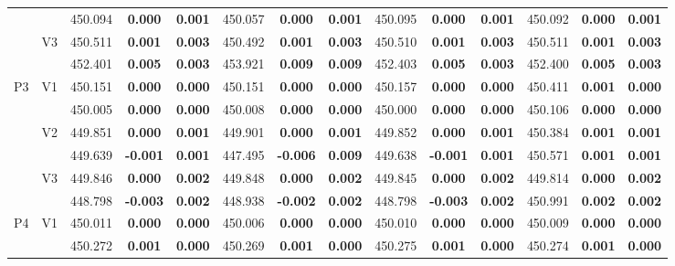 \documentclass[12pt,a4paper]{article}
\begin{document}
\begin{sidewaystable}[H]
{\begin{tabular}{cc|ccc|ccc|ccc|ccc|}
   &  & 450.094 & \textbf{0.000} & \textbf{0.001} & 450.057 & \textbf{0.000} & \textbf{0.001} & 450.095 & \textbf{0.000} & \textbf{0.001} & 450.092 & \textbf{0.000} & \textbf{0.001} \\ 
   & \multirow{2}{*}{V3} & 450.511 & \textbf{0.001} & \textbf{0.003} & 450.492 & \textbf{0.001} & \textbf{0.003} & 450.510 & \textbf{0.001} & \textbf{0.003} & 450.511 & \textbf{0.001} & \textbf{0.003} \\ 
   &  & 452.401 & \textbf{0.005} & \textbf{0.003} & 453.921 & \textbf{0.009} & \textbf{0.009} & 452.403 & \textbf{0.005} & \textbf{0.003} & 452.400 & \textbf{0.005} & \textbf{0.003} \\ 
   \hline \hline\multirow{6}{*}{P3} & \multirow{2}{*}{V1} & 450.151 & \textbf{0.000} & \textbf{0.000} & 450.151 & \textbf{0.000} & \textbf{0.000} & 450.157 & \textbf{0.000} & \textbf{0.000} & 450.411 & \textbf{0.001} & \textbf{0.000} \\ 
   &  & 450.005 & \textbf{0.000} & \textbf{0.000} & 450.008 & \textbf{0.000} & \textbf{0.000} & 450.000 & \textbf{0.000} & \textbf{0.000} & 450.106 & \textbf{0.000} & \textbf{0.000} \\ 
   & \multirow{2}{*}{V2} & 449.851 & \textbf{0.000} & \textbf{0.001} & 449.901 & \textbf{0.000} & \textbf{0.001} & 449.852 & \textbf{0.000} & \textbf{0.001} & 450.384 & \textbf{0.001} & \textbf{0.001} \\ 
   &  & 449.639 & \textbf{-0.001} & \textbf{0.001} & 447.495 & \textbf{-0.006} & \textbf{0.009} & 449.638 & \textbf{-0.001} & \textbf{0.001} & 450.571 & \textbf{0.001} & \textbf{0.001} \\ 
   & \multirow{2}{*}{V3} & 449.846 & \textbf{0.000} & \textbf{0.002} & 449.848 & \textbf{0.000} & \textbf{0.002} & 449.845 & \textbf{0.000} & \textbf{0.002} & 449.814 & \textbf{0.000} & \textbf{0.002} \\ 
   &  & 448.798 & \textbf{-0.003} & \textbf{0.002} & 448.938 & \textbf{-0.002} & \textbf{0.002} & 448.798 & \textbf{-0.003} & \textbf{0.002} & 450.991 & \textbf{0.002} & \textbf{0.002} \\ 
   \hline \hline\multirow{6}{*}{P4} & \multirow{2}{*}{V1} & 450.011 & \textbf{0.000} & \textbf{0.000} & 450.006 & \textbf{0.000} & \textbf{0.000} & 450.010 & \textbf{0.000} & \textbf{0.000} & 450.009 & \textbf{0.000} & \textbf{0.000} \\ 
   &  & 450.272 & \textbf{0.001} & \textbf{0.000} & 450.269 & \textbf{0.001} & \textbf{0.000} & 450.275 & \textbf{0.001} & \textbf{0.000} & 450.274 & \textbf{0.001} & \textbf{0.000} \\ 

\end{tabular}}
\end{sidewaystable}
\end{document}
